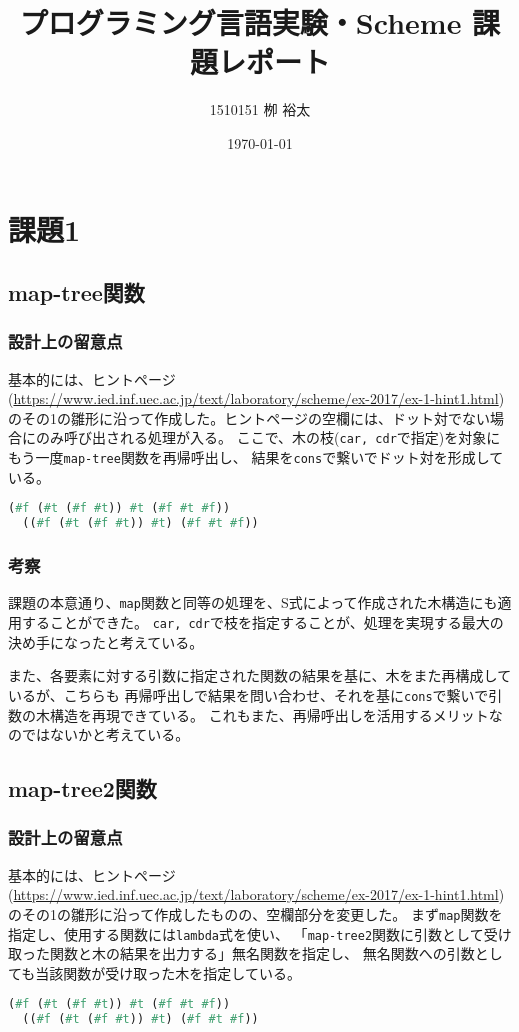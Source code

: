 \documentclass[11pt,a4paper, uplatex]{jsarticle}
\title{プログラミング言語実験・Scheme 課題レポート}
\author{1510151  栁 裕太}
\date{\today}
\begin{document}
\maketitle

\section{課題1}
\subsection{map-tree関数}
\subsubsection{設計上の留意点}
基本的には、ヒントページ
(\url{https://www.ied.inf.uec.ac.jp/text/laboratory/scheme/ex-2017/ex-1-hint1.html})
のその1の雛形に沿って作成した。ヒントページの空欄には、ドット対でない場合にのみ呼び出される処理が入る。
ここで、木の枝(\texttt{car, cdr}で指定)を対象にもう一度\texttt{map-tree}関数を再帰呼出し、
結果を\texttt{cons}で繋いでドット対を形成している。
\begin{lstlisting}[language=lisp, caption=\texttt{map-tree}関数実行例(対象関数:\texttt{even?})]
  (#f (#t (#f #t)) #t (#f #t #f))
  ((#f (#t (#f #t)) #t) (#f #t #f))
\end{lstlisting}

\subsubsection{考察}
課題の本意通り、\texttt{map}関数と同等の処理を、S式によって作成された木構造にも適用することができた。
\texttt{car, cdr}で枝を指定することが、処理を実現する最大の決め手になったと考えている。

また、各要素に対する引数に指定された関数の結果を基に、木をまた再構成しているが、こちらも
再帰呼出しで結果を問い合わせ、それを基に\texttt{cons}で繋いで引数の木構造を再現できている。
これもまた、再帰呼出しを活用するメリットなのではないかと考えている。

\subsection{map-tree2関数}
\subsubsection{設計上の留意点}
基本的には、ヒントページ
(\url{https://www.ied.inf.uec.ac.jp/text/laboratory/scheme/ex-2017/ex-1-hint1.html})
のその1の雛形に沿って作成したものの、空欄部分を変更した。
まず\texttt{map}関数を指定し、使用する関数には\texttt{lambda}式を使い、
「\texttt{map-tree2}関数に引数として受け取った関数と木の結果を出力する」無名関数を指定し、
無名関数への引数としても当該関数が受け取った木を指定している。
\begin{lstlisting}[language=lisp, caption=\texttt{map-tree2}関数実行例(対象関数:\texttt{even?})]
  (#f (#t (#f #t)) #t (#f #t #f))
  ((#f (#t (#f #t)) #t) (#f #t #f))
\end{lstlisting}
\end{document}
